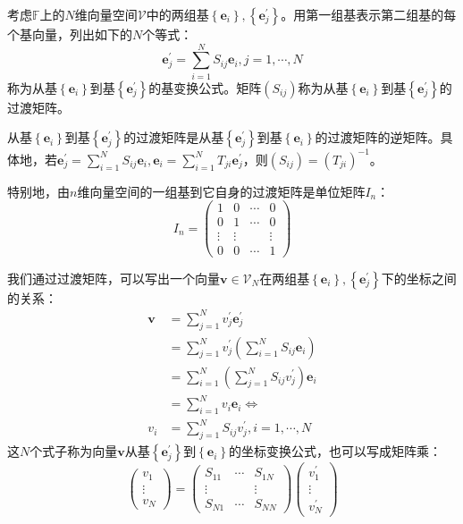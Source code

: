 \documentclass[main.tex]{subfiles}
\begin{document}
考虑$\mathbb{F}$上的$N$维向量空间$\mathcal{V}$中的两组基$\left\{\mathbf{e}_i\right\},\left\{\mathbf{e}^\prime_j\right\}$。用第一组基表示第二组基的每个基向量，列出如下的$N$个等式：
\[\mathbf{e}^\prime_j=\sum_{i=1}^NS_{ij}\mathbf{e}_i,j=1,\cdots,N\]
称为从基$\left\{\mathbf{e}_i\right\}$到基$\left\{\mathbf{e}^\prime_j\right\}$的基变换公式。矩阵$\left(S_{ij}\right)$称为从基$\left\{\mathbf{e}_i\right\}$到基$\left\{\mathbf{e}^\prime_j\right\}$的过渡矩阵。
\begin{theorem}
从基$\left\{\mathbf{e}_i\right\}$到基$\left\{\mathbf{e}^\prime_j\right\}$的过渡矩阵是从基$\left\{\mathbf{e}^\prime_j\right\}$到基$\left\{\mathbf{e}_i\right\}$的过渡矩阵的逆矩阵。具体地，若$\mathbf{e}^\prime_j=\sum_{i=1}^NS_{ij}\mathbf{e}_i,\mathbf{e}_i=\sum_{i=1}^NT_{ji}\mathbf{e}^\prime_j$，则$\left(S_{ij}\right)=\left(T_{ji}\right)^{-1}$。
\end{theorem}

特别地，由$n$维向量空间的一组基到它自身的过渡矩阵是单位矩阵$I_n$：
\[I_n=\left(\begin{array}{cccc}
 1& 0 &\cdots  &0 \\ 
 0&1  &\cdots  &0 \\ 
 \vdots&\vdots  &  &\vdots \\ 
 0&0  &\cdots  &1 
\end{array}\right)\]

我们通过过渡矩阵，可以写出一个向量$\mathbf{v}\in\mathcal{V}_N$在两组基$\left\{\mathbf{e}_i\right\},\left\{\mathbf{e}^\prime_j\right\}$下的坐标之间的关系：
\begin{equation*}
\begin{split}
\mathbf{v}&=\sum_{j=1}^Nv^\prime_j\mathbf{e}^\prime_j\\
&=\sum_{j=1}^Nv^\prime_j\left(\sum_{i=1}^NS_{ij}\mathbf{e}_i\right)\\
&=\sum_{i=1}^N\left(\sum_{j=1}^N S_{ij}v^\prime_j\right)\mathbf{e}_i\\
&=\sum_{i=1}^Nv_i\mathbf{e}_i
\Leftrightarrow\\
v_i&=\sum_{j=1}^NS_{ij}v^\prime_j,i=1,\cdots,N
\end{split}
\end{equation*}
这$N$个式子称为向量$\mathbf{v}$从基$\left\{\mathbf{e}^\prime_j\right\}$到$\left\{\mathbf{e}_i\right\}$的坐标变换公式，也可以写成矩阵乘：
\[\left(\begin{array}{c}v_1\\\vdots\\v_N\end{array}\right)=\left(\begin{array}{ccc}S_{11}&\cdots&S_{1N}\\\vdots&&\vdots\\S_{N1}&\cdots&S_{NN}\end{array}\right)\left(\begin{array}{c}v^\prime_1\\\vdots\\v^\prime_N\end{array}\right)\]
\end{document}
